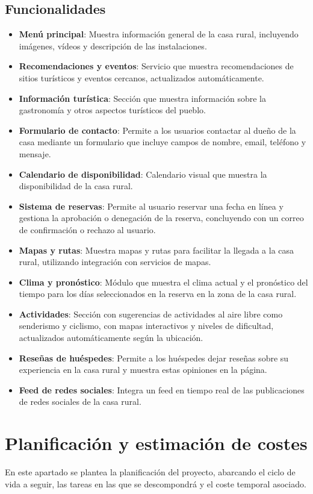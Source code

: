 \subsection{Funcionalidades}
\begin{itemize}
    \item \textbf{Menú principal}: Muestra información general de la casa rural, incluyendo imágenes, vídeos y descripción de las instalaciones.
    \item \textbf{Recomendaciones y eventos}: Servicio que muestra recomendaciones de sitios turísticos y eventos cercanos, actualizados automáticamente.
    \item \textbf{Información turística}: Sección que muestra información sobre la gastronomía y otros aspectos turísticos del pueblo.
    \item \textbf{Formulario de contacto}: Permite a los usuarios contactar al dueño de la casa mediante un formulario que incluye campos de nombre, email, teléfono y mensaje.
    \item \textbf{Calendario de disponibilidad}: Calendario visual que muestra la disponibilidad de la casa rural.
    \item \textbf{Sistema de reservas}: Permite al usuario reservar una fecha en línea y gestiona la aprobación o denegación de la reserva, concluyendo con un correo de confirmación o rechazo al usuario.
    \item \textbf{Mapas y rutas}: Muestra mapas y rutas para facilitar la llegada a la casa rural, utilizando integración con servicios de mapas.
    \item \textbf{Clima y pronóstico}: Módulo que muestra el clima actual y el pronóstico del tiempo para los días seleccionados en la reserva en la zona de la casa rural.
    \item \textbf{Actividades}: Sección con sugerencias de actividades al aire libre como senderismo y ciclismo, con mapas interactivos y niveles de dificultad, actualizados automáticamente según la ubicación.
    \item \textbf{Reseñas de huéspedes}: Permite a los huéspedes dejar reseñas sobre su experiencia en la casa rural y muestra estas opiniones en la página.
    \item \textbf{Feed de redes sociales}: Integra un feed en tiempo real de las publicaciones de redes sociales de la casa rural.
\end{itemize}

\section{Planificación y estimación de costes}
En este apartado se plantea la planificación del proyecto, abarcando el ciclo de vida a seguir, las tareas en las que se descompondrá y el coste temporal asociado.

